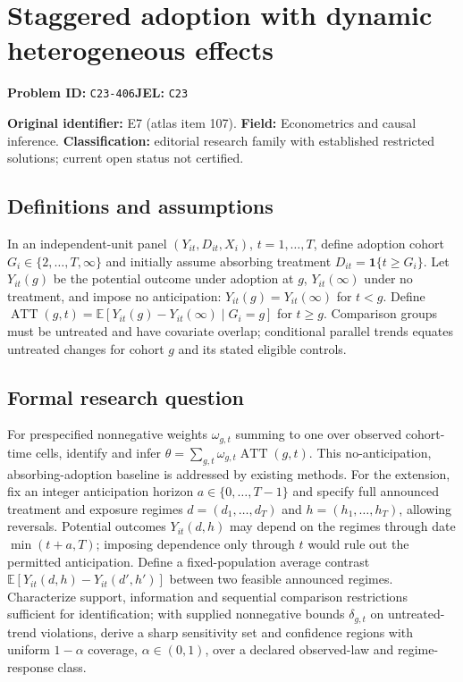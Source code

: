 \documentclass[11pt,a4paper]{article}
\begin{document}
\section*{Staggered adoption with dynamic heterogeneous effects}
\textbf{Problem ID:} \texttt{C23-406}\quad \textbf{JEL:} \texttt{C23}\par
\label{problem:OP-0107}
\label{atlas:prob:E7}

\noindent\textbf{Original identifier:} E7 (atlas item 107). \textbf{Field:} Econometrics and causal inference. \textbf{Classification:} editorial research family with established restricted solutions; current open status not certified.

\subsection*{Definitions and assumptions}

In an independent-unit panel $(Y_{it},D_{it},X_i)$, $t=1,\ldots,T$, define adoption cohort $G_i\in\{2,\ldots,T,\infty\}$ and initially assume absorbing treatment $D_{it}=\mathbf1\{t\ge G_i\}$. Let $Y_{it}(g)$ be the potential outcome under adoption at $g$, $Y_{it}(\infty)$ under no treatment, and impose no anticipation: $Y_{it}(g)=Y_{it}(\infty)$ for $t<g$. Define $\operatorname{ATT}(g,t)=\mathbb E[Y_{it}(g)-Y_{it}(\infty)\mid G_i=g]$ for $t\ge g$. Comparison groups must be untreated and have covariate overlap; conditional parallel trends equates untreated changes for cohort $g$ and its stated eligible controls.

\subsection*{Formal research question}

For prespecified nonnegative weights $\omega_{g,t}$ summing to one over observed cohort-time cells, identify and infer $\theta=\sum_{g,t}\omega_{g,t}\operatorname{ATT}(g,t)$. This no-anticipation, absorbing-adoption baseline is addressed by existing methods. For the extension, fix an integer anticipation horizon $a\in\{0,\ldots,T-1\}$ and specify full announced treatment and exposure regimes $d=(d_1,\ldots,d_T)$ and $h=(h_1,\ldots,h_T)$, allowing reversals. Potential outcomes $Y_{it}(d,h)$ may depend on the regimes through date $\min(t+a,T)$; imposing dependence only through $t$ would rule out the permitted anticipation. Define a fixed-population average contrast $\mathbb E[Y_{it}(d,h)-Y_{it}(d',h')]$ between two feasible announced regimes. Characterize support, information and sequential comparison restrictions sufficient for identification; with supplied nonnegative bounds $\delta_{g,t}$ on untreated-trend violations, derive a sharp sensitivity set and confidence regions with uniform $1-\alpha$ coverage, $\alpha\in(0,1)$, over a declared observed-law and regime-response class.
\end{document}
